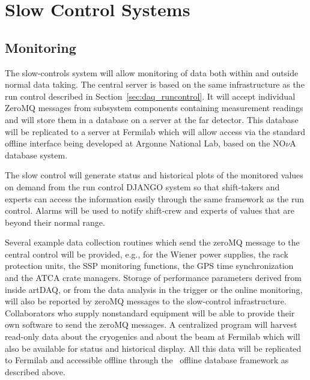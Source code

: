 \section{Slow Control Systems }
\label{sec:daq_slowcontrol}

\subsection{Monitoring}

The slow-controls system will allow monitoring of data both within and
outside normal data taking.  The central server is based on the
same infrastructure as the run control described in
Section~\ref{sec:daq_runcontrol}.  It will accept individual ZeroMQ
messages from subsystem components containing measurement readings
and will store them in a database on a server at the far detector.
This database will be replicated to a server at Fermilab which will
allow access via the standard offline interface being developed at
Argonne National Lab, based on the NO$\nu$A database system.

The slow control will generate status and historical plots of the
monitored values on demand from the run control DJANGO system so that
shift-takers and experts can access the information easily through
the same framework as the run control.  Alarms will be used to
notify shift-crew and experts of values that are beyond
their normal range.

Several example data collection routines which send the zeroMQ message
to the central control will be provided, e.g., for the Wiener power
supplies, the rack protection units, the SSP monitoring functions, the
GPS time synchronization and the ATCA crate managers.  Storage of
performance parameters derived from inside artDAQ, or from the data
analysis in the trigger or the online monitoring, will also be reported
by zeroMQ messages to the slow-control infrastructure.  Collaborators
who supply nonstandard equipment will be able to provide their own
software to send the zeroMQ messages.  A centralized program will
harvest read-only data about the cryogenics and about the beam at
Fermilab which will also be available for status and historical
display.  All this data will be replicated to Fermilab and accessible
offline through the \LBNE\ offline database framework as described
above.

